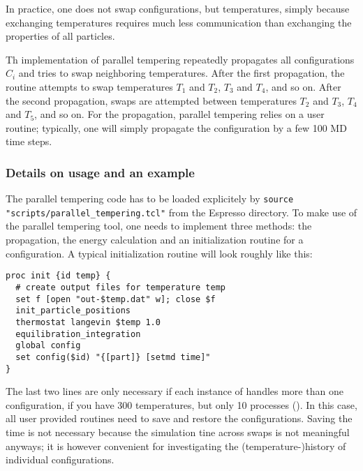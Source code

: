 In practice, one does not swap configurations, but temperatures, simply because exchanging
temperatures requires much less communication than exchanging the properties of all particles.

Th \es{} implementation of parallel tempering repeatedly propagates all configurations $C_i$ and
tries to swap neighboring temperatures. After the first propagation, the routine attempts to swap
temperatures $T_1$ and $T_2$, $T_3$ and $T_4$, and so on. After the second propagation, swaps are
attempted between temperatures $T_2$ and $T_3$, $T_4$ and $T_5$, and so on.  For the propagation,
parallel tempering relies on a user routine; typically, one will simply propagate the configuration
by a few 100 MD time steps.

\subsubsection{Details on usage and an example}

The parallel tempering code has to be loaded explicitely by {\tt source
  "scripts/parallel_tempering.tcl"} from the Espresso directory. To make use of the parallel
tempering tool, one needs to implement three methods: the propagation, the energy calculation and
an initialization routine for a configuration. A typical initialization routine will look roughly
like this:
\begin{verbatim}
proc init {id temp} {
  # create output files for temperature temp
  set f [open "out-$temp.dat" w]; close $f
  init_particle_positions
  thermostat langevin $temp 1.0
  equilibration_integration
  global config
  set config($id) "{[part]} [setmd time]"
}
\end{verbatim}
The last two lines are only necessary if each instance of \es{} handles more than one
configuration, \eg if you have 300 temperatures, but only 10 \es{} processes
().  In this case, all
user provided routines need to save and restore the configurations. Saving the time is not
necessary because the simulation tine across swaps is not meaningful anyways; it is however
convenient for investigating the (temperature-)history of individual configurations.

